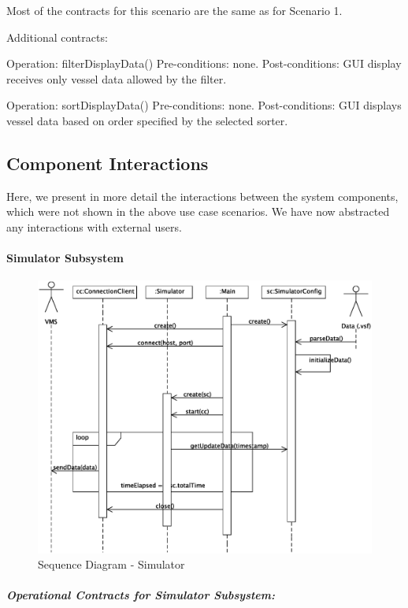 \documentclass{article}
\begin{document}
Most of the contracts for this scenario are the same as for Scenario 1.

Additional contracts:

Operation: filterDisplayData()
Pre-conditions: none.
Post-conditions: GUI display receives only vessel data allowed by the filter.

Operation: sortDisplayData()
Pre-conditions: none.
Post-conditions: GUI displays vessel data based on order specified by the selected sorter.

\subsection{Component Interactions}

Here, we present in more detail the interactions between the system components, which were not shown in the above use case scenarios. We have now abstracted any interactions with external users.

\paragraph{Simulator Subsystem}

\begin{figure}[!htb]
\caption{Sequence Diagram - Simulator}
\centering
\includegraphics[scale=0.6]{diagrams/simulator-sequence-diagram.eps}
\end{figure}

\subparagraph{Operational Contracts for Simulator Subsystem:}
\end{document}
